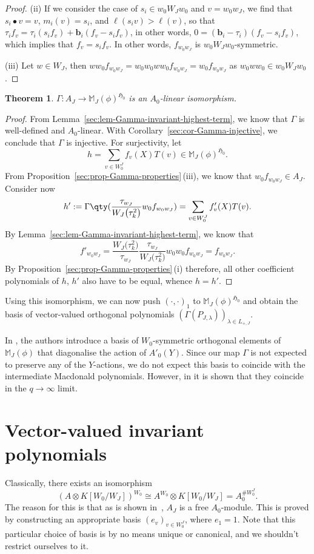 \documentclass[pdftex]{sigma}
\newtheorem{Theorem}{Theorem}[section]
\theoremstyle{definition}
\numberwithin{equation}{section}
\begin{document}
\begin{proof}
(ii) If we consider the case of $s_i\in w_0W_Jw_0$ and $v=w_0w_J$, we find
 that $s_i\bullet v=v$, $m_i(v)=s_i$, and $\ell(s_iv)>\ell(v)$, so that
$
 \tau_i f_v = \tau_i (s_if_v) + \bm{b}_i(f_v-s_if_v)$,
 in other words,
$
 0 = (\bm{b}_i-\tau_i)(f_v-s_if_v)$,
 which implies that $f_v=s_if_v$. In other words, $f_{w_0w_J}$ is
 $w_0W_Jw_0$-symmetric.

(iii) Let $w\in W_J$, then
$
 w w_0 f_{w_0w_J} = w_0 w_0 w w_0 f_{w_0w_J}
 = w_0 f_{w_0w_J}
$
 as $w_0ww_0\in w_0W_Jw_0$.
\end{proof}

\begin{Theorem}
 $\Gamma\colon A_J\to \mathbb{M}_J(\phi)^{\mathfrak{H}_0}$ is an
 $A_0$-linear isomorphism.
\end{Theorem}
\begin{proof}
 From Lemma~\ref{sec:lem-Gamma-invariant-highest-term}, we know that
 $\Gamma$ is well-defined and $A_0$-linear. With Corollary~\ref{sec:cor-Gamma-injective}, we conclude that $\Gamma$ is injective. For surjectivity,
 let
 \[
 h = \sum_{v\in W_0^J} f_v(X)T(v)\in\mathbb{M}_J(\phi)^{\mathfrak{H}_0}.
 \]
 From Proposition~\ref{sec:prop-Gamma-properties}\,(iii), we know that
 $w_0f_{w_0w_J}\in A_J$. Consider now
 \[
 h' := \Gamma\qty(\frac{\tau_{w_J}}{W_J\bigl(\tau_k^2\bigr)} w_0f_{w_0w_J})
 = \sum_{v\in W_0^J} f'_v(X)T(v).
 \]
 By Lemma~\ref{sec:lem-Gamma-invariant-highest-term}, we know that
 \[
 f'_{w_0w_J} = \frac{W_J\bigl(\tau_k^2\bigr)}{\tau_{w_J}}
 \frac{\tau_{w_J}}{W_J\bigl(\tau_k^2\bigr)} w_0 w_0 f_{w_0w_J}
 = f_{w_0w_J}.
 \]
 By Proposition~\ref{sec:prop-Gamma-properties}\,(i) therefore,
 all other coefficient polynomials of $h$, $h'$ also have to be equal,
 whence $h=h'$.
\end{proof}

Using this isomorphism, we can now push $(\cdot,\cdot)_1$ to
$\mathbb{M}_J(\phi)^{\mathfrak{H}_0}$ and obtain the basis of vector-valued
orthogonal polynomials $(\Gamma(P_{J,\lambda}))_{\lambda\in L_{+,J}}$.

In \cite[Section~6.6]{stokmanInduced}, the authors introduce a basis
of $W_0$-symmetric orthogonal elements of~$\mathbb{M}_J(\phi)$ that
diagonalise the action of $A'_0(Y)$. Since our map $\Gamma$ is not
expected to preserve
any of the $Y$-actions, we do not expect this basis to coincide with the intermediate Macdonald polynomials.
However, in \cite[Theorem~7.6]{Ven25} it is shown that they coincide in the
$q\to\infty$ limit.

\section{Vector-valued invariant polynomials}\label{sec:w0-invariant}
Classically, there exists an isomorphism
\[
 (A\otimes K[W_0/W_J])^{W_0}
 \cong A^{W_0} \otimes K[W_0/W_J]
 = A_0^{\# W_0^J}.
\]
The reason for this is that as is shown in~\cite{pittieSteinberg},
$A_J$ is a free $A_0$-module. This is proved by constructing an appropriate
basis $(e_v)_{v\in W_0^J}$, where $e_1=1$. Note that this
particular choice of basis is by no means unique or canonical, and we shouldn't
restrict ourselves to it.
\end{document}
